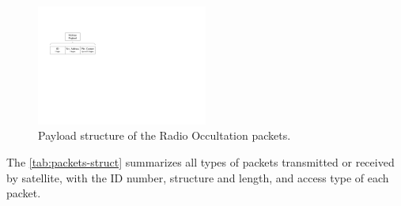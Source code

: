 \begin{figure}[!htb]
    \begin{center}
        \includegraphics[width=0.5\textwidth]{figures/floripasat-packet-structure.pdf}
        \caption{Payload structure of the Radio Occultation packets.}
        \label{fig:fsat-pkt-structure}
    \end{center}
\end{figure}

The \autoref{tab:packets-struct} summarizes all types of packets transmitted or received by satellite, with the ID number, structure and length, and access type of each packet.

